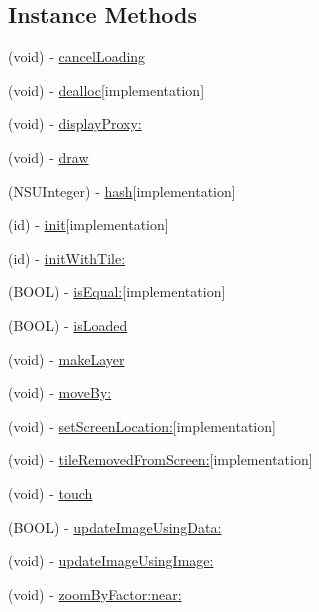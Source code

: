 \subsection*{Instance Methods}
\begin{DoxyCompactItemize}
\item 
(void) -\/ \hyperlink{interface_r_m_tile_image_a2a34d421ea651b726355c6dd91efcf18}{cancel\-Loading}
\item 
(void) -\/ \hyperlink{interface_r_m_tile_image_ac937dd49368b865545c35346c0d9ba42}{dealloc}{\ttfamily  \mbox{[}implementation\mbox{]}}
\item 
(void) -\/ \hyperlink{interface_r_m_tile_image_abe1cb998e8fadd2f9eeb03fab2a09a23}{display\-Proxy\-:}
\item 
(void) -\/ \hyperlink{interface_r_m_tile_image_aa41c2e2d12937c9091890f4d9d6ccb6a}{draw}
\item 
(N\-S\-U\-Integer) -\/ \hyperlink{interface_r_m_tile_image_ad5699209c3b527f83c6bf466a55bc1d1}{hash}{\ttfamily  \mbox{[}implementation\mbox{]}}
\item 
(id) -\/ \hyperlink{interface_r_m_tile_image_a2b44225b0eef4f486b0624dfc1bc8117}{init}{\ttfamily  \mbox{[}implementation\mbox{]}}
\item 
(id) -\/ \hyperlink{interface_r_m_tile_image_af81c0275daf2fe4ac2fb601adb2668de}{init\-With\-Tile\-:}
\item 
(B\-O\-O\-L) -\/ \hyperlink{interface_r_m_tile_image_a71a6e68ffce34719a4adea2c0f398333}{is\-Equal\-:}{\ttfamily  \mbox{[}implementation\mbox{]}}
\item 
(B\-O\-O\-L) -\/ \hyperlink{interface_r_m_tile_image_a48c550ece99d79ca32dae2ba59c882a6}{is\-Loaded}
\item 
(void) -\/ \hyperlink{interface_r_m_tile_image_afef4888511269ba4ecc0f2ca1aaf1829}{make\-Layer}
\item 
(void) -\/ \hyperlink{interface_r_m_tile_image_a47362b08d1e2b6648becc13bb902d87d}{move\-By\-:}
\item 
(void) -\/ \hyperlink{interface_r_m_tile_image_a641b226269ef2b0acd108d704936efa0}{set\-Screen\-Location\-:}{\ttfamily  \mbox{[}implementation\mbox{]}}
\item 
(void) -\/ \hyperlink{interface_r_m_tile_image_ae80449074936804a5ad4d5733b6bf74d}{tile\-Removed\-From\-Screen\-:}{\ttfamily  \mbox{[}implementation\mbox{]}}
\item 
(void) -\/ \hyperlink{interface_r_m_tile_image_a66e91ebc7cb49def8db74cf15216d37a}{touch}
\item 
(B\-O\-O\-L) -\/ \hyperlink{interface_r_m_tile_image_a9b81c14a28751e9573f82558d94323f5}{update\-Image\-Using\-Data\-:}
\item 
(void) -\/ \hyperlink{interface_r_m_tile_image_a4bc389317843f064158b5ed6db0bccd2}{update\-Image\-Using\-Image\-:}
\item 
(void) -\/ \hyperlink{interface_r_m_tile_image_ab1af8a6659447686bf76623425660e0f}{zoom\-By\-Factor\-:near\-:}
\end{DoxyCompactItemize}
